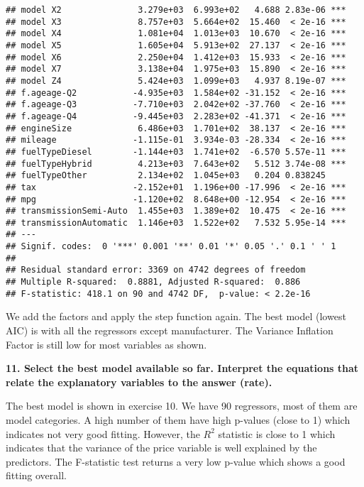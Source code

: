 \documentclass[
]{article}
\begin{document}
\begin{verbatim}
## model X2               3.279e+03  6.993e+02   4.688 2.83e-06 ***
## model X3               8.757e+03  5.664e+02  15.460  < 2e-16 ***
## model X4               1.081e+04  1.013e+03  10.670  < 2e-16 ***
## model X5               1.605e+04  5.913e+02  27.137  < 2e-16 ***
## model X6               2.250e+04  1.412e+03  15.933  < 2e-16 ***
## model X7               3.138e+04  1.975e+03  15.890  < 2e-16 ***
## model Z4               5.424e+03  1.099e+03   4.937 8.19e-07 ***
## f.ageage-Q2           -4.935e+03  1.584e+02 -31.152  < 2e-16 ***
## f.ageage-Q3           -7.710e+03  2.042e+02 -37.760  < 2e-16 ***
## f.ageage-Q4           -9.445e+03  2.283e+02 -41.371  < 2e-16 ***
## engineSize             6.486e+03  1.701e+02  38.137  < 2e-16 ***
## mileage               -1.115e-01  3.934e-03 -28.334  < 2e-16 ***
## fuelTypeDiesel        -1.144e+03  1.741e+02  -6.570 5.57e-11 ***
## fuelTypeHybrid         4.213e+03  7.643e+02   5.512 3.74e-08 ***
## fuelTypeOther          2.134e+02  1.045e+03   0.204 0.838245    
## tax                   -2.152e+01  1.196e+00 -17.996  < 2e-16 ***
## mpg                   -1.120e+02  8.648e+00 -12.954  < 2e-16 ***
## transmissionSemi-Auto  1.455e+03  1.389e+02  10.475  < 2e-16 ***
## transmissionAutomatic  1.146e+03  1.522e+02   7.532 5.95e-14 ***
## ---
## Signif. codes:  0 '***' 0.001 '**' 0.01 '*' 0.05 '.' 0.1 ' ' 1
## 
## Residual standard error: 3369 on 4742 degrees of freedom
## Multiple R-squared:  0.8881, Adjusted R-squared:  0.886 
## F-statistic: 418.1 on 90 and 4742 DF,  p-value: < 2.2e-16
\end{verbatim}

We add the factors and apply the step function again. The best model
(lowest AIC) is with all the regressors except manufacturer. The
Variance Inflation Factor is still low for most variables as shown.

\newpage

\textbf{11. Select the best model available so far. Interpret the equations that relate the explanatory variables to the answer (rate).}

The best model is shown in exercise 10. We have 90 regressors, most of
them are model categories. A high number of them have high p-values
(close to 1) which indicates not very good fitting. However, the \(R^2\)
statistic is close to 1 which indicates that the variance of the price
variable is well explained by the predictors. The F-statistic test
returns a very low p-value which shows a good fitting overall.

\newpage
\end{document}
